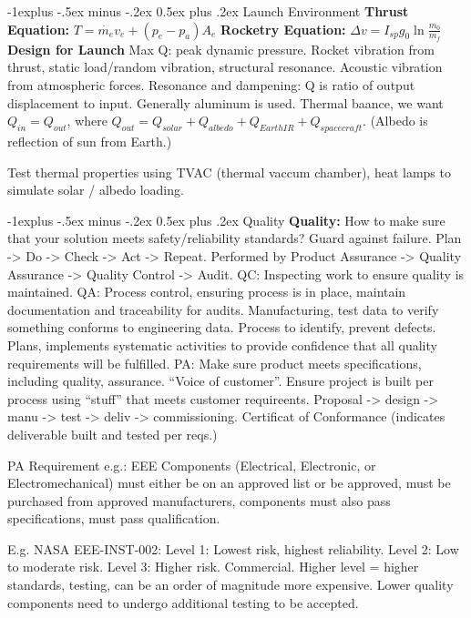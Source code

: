 \documentclass[letterpaper, 8pt]{extarticle}
\makeatletter
\renewcommand{\section}{\@startsection{section}{1}{0mm}%
                                {-1explus -.5ex minus -.2ex}%
                                {0.5ex plus .2ex}%
                                {\normalfont\small\bfseries}}
\makeatother
\begin{document}
\begin{multicols*}{5}
\section{Launch Environment}
\textbf{Thrust Equation:}
$T = \dot{m_e} v_e + (p_e - p_a)A_e$
\textbf{Rocketry Equation:}
$\Delta v = I_{sp} g_0 \ln \frac{m_0}{m_f}$
\textbf{Design for Launch}
Max Q: peak dynamic pressure.
Rocket vibration from thrust, static load/random vibration, structural resonance.
Acoustic vibration from atmospheric forces.
Resonance and dampening:
Q is ratio of output displacement to input.
Generally aluminum is used.
Thermal baance, we want $Q_{in} = Q_{out}$,
where $Q_{out} = Q_{solar} + Q_{albedo} + Q_{EarthIR} + Q_{spacecraft}$.
(Albedo is reflection of sun from Earth.)

Test thermal properties using TVAC (thermal vaccum chamber), heat lamps to simulate solar / albedo loading.

\section{Quality}
\textbf{Quality:} How to make sure that your solution meets safety/reliability standards?
Guard against failure.
Plan -> Do -> Check -> Act -> Repeat.
Performed by Product Assurance -> Quality Assurance -> Quality Control -> Audit.
QC: Inspecting work to ensure quality is maintained.
QA: Process control, ensuring process is in place, maintain documentation and traceability for audits.
Manufacturing, test data to verify something conforms to engineering data.
Process to identify, prevent defects.
Plans, implements systematic activities to provide confidence that all quality requirements will be fulfilled.
PA: Make sure product meets specifications, including quality, assurance. ``Voice of customer''.
Ensure project is built per process using ``stuff'' that meets customer requireents.
Proposal -> design -> manu -> test -> deliv -> commissioning.
Certificat of Conformance (indicates deliverable built and tested per reqs.)

PA Requirement e.g.: EEE Components (Electrical, Electronic, or Electromechanical)
must either be on an approved list or be approved,
must be purchased from approved manufacturers,
components must also pass specifications,
must pass qualification.

E.g. NASA EEE-INST-002:
Level 1: Lowest risk, highest reliability.
Level 2: Low to moderate risk.
Level 3: Higher risk.
Commercial.
Higher level = higher standards, testing, can be an order of magnitude more expensive.
Lower quality components need to undergo additional testing to be accepted.


\end{multicols*}
\end{document}
